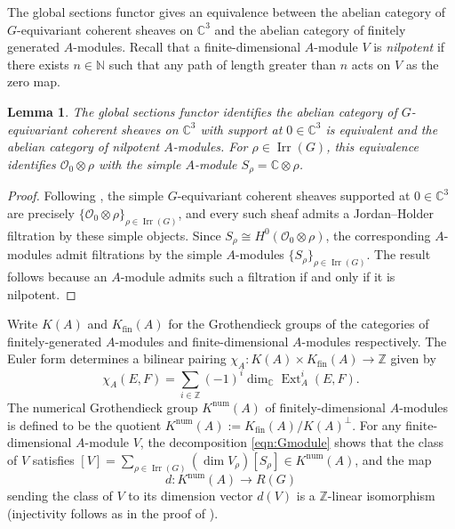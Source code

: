 \documentclass[11pt,reqno]{amsart}
\numberwithin{equation}{section}
\newtheorem{lemma}[theorem]{Lemma}
\theoremstyle{definition}
\newcommand{\CC}{\ensuremath{\mathbb{C}}}
\newcommand{\ZZ}{\ensuremath{\mathbb{Z}}}
\newcommand{\Ext}{\operatorname{Ext}}
\newcommand{\0}{\operatorname{0}}
\newcommand{\Irr}{\operatorname{Irr}}
\newcommand{\Knum}{K^{\operatorname{num}}}
\begin{document}
 The global sections functor gives an equivalence between the abelian category of $G$-equivariant coherent sheaves on $\mathbb{C}^3$ and the abelian category of finitely generated $A$-modules. Recall that a finite-dimensional $A$-module $V$ is \emph{nilpotent} if there exists $n\in \mathbb{N}$ such that any path of length greater than $n$ acts on $V$ as the zero map. 
 
 \begin{lemma}
 \label{lem:abelianequiv}
    The global sections functor identifies the abelian category of $G$-equivariant coherent sheaves on $\mathbb{C}^3$ with support at $0\in \mathbb{C}^3$ is equivalent and the abelian category of nilpotent $A$-modules. For $\rho\in \Irr(G)$, this equivalence identifies $\mathcal{O}_0\otimes \rho$ with the simple $A$-module $S_\rho=\CC\otimes \rho$.
 \end{lemma}
 \begin{proof}
  Following \cite[Proof of Lemma~8.1]{BKR01}, the simple $G$-equivariant coherent sheaves supported at $0\in \mathbb{C}^3$ are precisely $\{\mathcal{O}_0\otimes \rho\}_{\rho\in \Irr(G)}$, and every such sheaf admits a Jordan--Holder filtration by these simple objects. Since $S_\rho\cong H^0(\mathcal{O}_0\otimes \rho)$, the corresponding $A$-modules admit filtrations by the simple $A$-modules $\{S_\rho \}_{\rho\in \Irr(G)}$. The result follows because an $A$-module admits such a filtration if and only if it is nilpotent.
 \end{proof}

 Write $K(A)$ and $K_{\text{fin}}(A)$ for the Grothendieck groups of the categories of finitely-generated $A$-modules and finite-dimensional $A$-modules respectively. The Euler form determines a bilinear pairing $\chi_A\colon K(A)\times K_{\text{fin}}(A)\to \ZZ$ given by
\[
\chi_A(E,F)=\sum_{i\in \ZZ} (-1)^i \dim_{\CC} \Ext_A^i(E,F).
\]
 The numerical Grothendieck group $\Knum(A)$ of finitely-dimensional $A$-modules is defined to be the quotient $\Knum(A):= K_{\text{fin}}(A)/K(A)^\perp$. For any finite-dimensional $A$-module $V$, the decomposition \eqref{eqn:Gmodule} shows that the class of $V$ satisfies $[V]=\sum_{\rho\in \Irr(G)} (\dim V_\rho) [S_\rho]\in \Knum(A)$, and the map
 \begin{equation}
     \label{eqn:KnumA}
     d\colon \Knum(A)\longrightarrow R(G)
 \end{equation}
 sending the class of $V$ to its dimension vector $d(V)$ is a $\ZZ$-linear isomorphism (injectivity follows as in the proof of \cite[Lemma~7.1.1]{BCZ17}).
 
\end{document}
